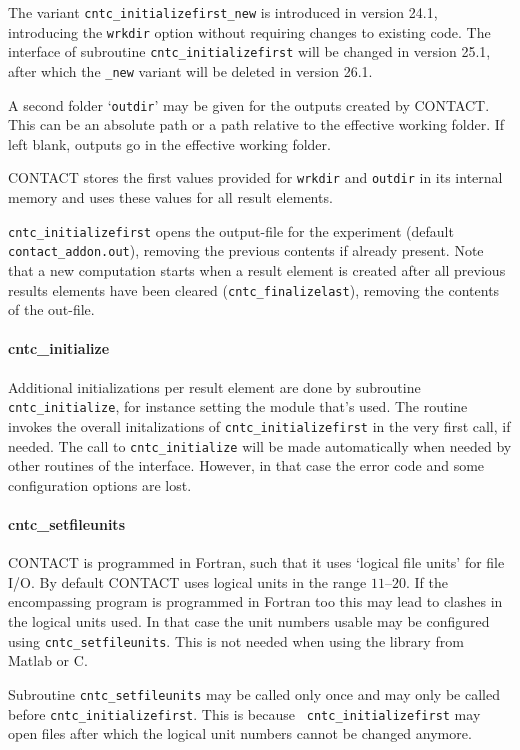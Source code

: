 \documentclass[12pt]{report}
\begin{document}
The variant {\tt cntc\_initializefirst\_new} is introduced in version 24.1,
introducing the {\tt wrkdir} option without requiring changes to existing
code. The interface of subroutine {\tt cntc\_initialize\-first} will be
changed in version 25.1, after which the {\tt \_new} variant will be deleted
in version 26.1.

A second folder `{\tt outdir}' may be given for the outputs created by
CONTACT. This can be an absolute path or a path relative to the effective
working folder. If left blank, outputs go in the effective working
folder.

CONTACT stores the first values provided for {\tt wrkdir} and {\tt outdir}
in its internal memory and uses these values for all result elements.

{\tt cntc\_initializefirst} opens the output-file for the experiment
(default {\tt contact\_addon.out}), removing the previous contents if
already present. Note that a new computation starts when a result element
is created after all previous results elements have been cleared
({\tt cntc\_finalizelast}), removing the contents of the out-file.

\paragraph{cntc\_initialize}

Additional initializations per result element are done by subroutine {\tt
cntc\_\-init\-ial\-ize}, for instance setting the module that's used. The
routine invokes the overall initalizations of {\tt cntc\_initializefirst}
in the very first call, if needed. The call to {\tt cntc\_initialize} will
be made automatically when needed by other routines of the interface.
However, in that case the error code and some configuration options are
lost.

\paragraph{cntc\_setfileunits}

CONTACT is programmed in Fortran, such that it uses `logical file units'
for file I/O. By default CONTACT uses logical units in the range
$11\text{--}20$. If the encompassing program is programmed in Fortran too
this may lead to clashes in the logical units used. In that case the unit
numbers usable may be configured using {\tt cntc\_setfileunits}. This is
not needed when using the library from Matlab or C.

Subroutine {\tt cntc\_setfileunits} may be called only once and may only be
called before {\tt cntc\_\-init\-ia\-lize\-first}. This is because {\tt
cntc\_initializefirst} may open files after which the logical unit numbers
cannot be changed anymore.
\end{document}
